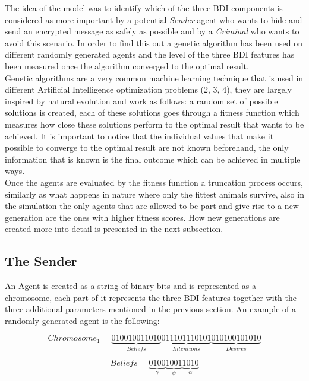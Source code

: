 \documentclass[a4paper]{article}
\begin{document}
The idea of the model was to identify which of the three BDI components is considered as more important by a potential \textit{Sender} agent who wants to hide and send an encrypted message as safely as possible and by a \textit{Criminal} who wants to avoid this scenario. In order to find this out a genetic algorithm has been used on different randomly generated agents and the level of the three BDI features has been measured once the algorithm converged to the optimal result. \\
Genetic algorithms are a very common machine learning technique that is used in different Artificial Intelligence optimization problems (2, 3, 4), they are largely inspired by natural evolution and work as follows: a random set of possible solutions is created, each of these solutions goes through a fitness function which measures how close these solutions perform to the optimal result that wants to be achieved. It is important to notice that the individual values that make it possible to converge to the optimal result are not known beforehand, the only information that is known is the final outcome which can be achieved in multiple ways.\\
Once the agents are evaluated by the fitness function a truncation process occurs, similarly as what happens in nature where only the fittest animals survive, also in the simulation the only agents that are allowed to be part and give rise to a new generation are the ones with higher fitness scores. How new generations are created more into detail is presented in the next subsection.


\subsection{The Sender}

An Agent is created as a string of binary bits and is represented as a chromosome, each part of it represents the three BDI features together with the three additional parameters mentioned in the previous section. An example of a randomly generated agent is the following:

\begin{equation}
	Chromosome_1 = \underbrace{010010011010}_{Beliefs}\underbrace{011101110101}_{Intentions}\underbrace{010100101010}_{Desires}
\end{equation}

\begin{equation}
	Beliefs = \underbrace{0100}_{\gamma} \underbrace{1001}_{\psi} \underbrace{1010}_{\alpha} 
\end{equation}  
\end{document}
